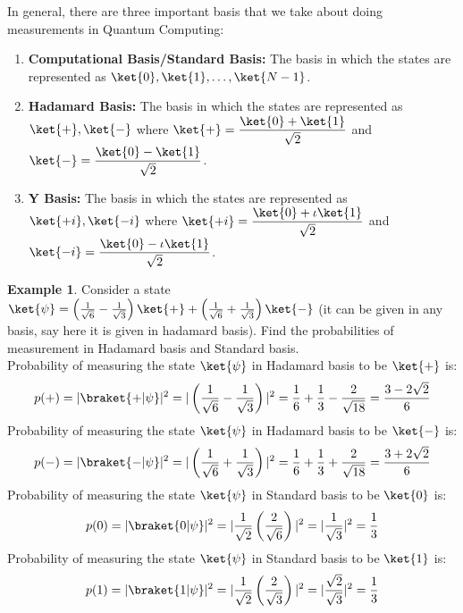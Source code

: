 \documentclass[12pt, oneside]{book}
\theoremstyle{definition}
\theoremstyle{definition}
\newtheorem{example}{Example}[section]
\theoremstyle{remark}
\begin{document}
\begin{importantnote}
    In general, there are three important basis that we take about doing measurements in Quantum Computing:
    \begin{enumerate}
        \item \textbf{Computational Basis/Standard Basis:} The basis in which the states are represented as $\ket{0},\ket{1},\ldots,\ket{N-1}$.
        \item \textbf{Hadamard Basis:} The basis in which the states are represented as $\ket{+},\ket{-}$ where $\ket{+}=\dfrac{\ket{0}+\ket{1}}{\sqrt{2}}$ and $\ket{-}=\dfrac{\ket{0}-\ket{1}}{\sqrt{2}}$.
        \item \textbf{Y Basis:} The basis in which the states are represented as $\ket{+i},\ket{-i}$ where $\ket{+i}=\dfrac{\ket{0}+\iota\ket{1}}{\sqrt{2}}$ and $\ket{-i}=\dfrac{\ket{0}-\iota\ket{1}}{\sqrt{2}}$.
    \end{enumerate}
\end{importantnote}

\begin{example}
    Consider a state $\ket{\psi}=\left(\frac{1}{\sqrt{6}}-\frac{1}{\sqrt{3}}\right)\ket{+}+\left(\frac{1}{\sqrt{6}}+\frac{1}{\sqrt{3}}\right)\ket{-}$ (it can be given in any basis, say here it is given in hadamard basis).
    Find the probabilities of measurement in Hadamard basis and Standard basis.\\
    Probability of measuring the state $\ket{\psi}$ in Hadamard basis to be $\ket{+}$ is:
    \[
        p(+)=|\braket{+|\psi}|^2=|\left(\frac{1}{\sqrt{6}}-\frac{1}{\sqrt{3}}\right)|^2=\frac{1}{6}+\frac{1}{3}-\frac{2}{\sqrt{18}}=\frac{3-2\sqrt{2}}{6}
    \]
    Probability of measuring the state $\ket{\psi}$ in Hadamard basis to be $\ket{-}$ is:
    \[
        p(-)=|\braket{-|\psi}|^2=|\left(\frac{1}{\sqrt{6}}+\frac{1}{\sqrt{3}}\right)|^2=\frac{1}{6}+\frac{1}{3}+\frac{2}{\sqrt{18}}=\frac{3+2\sqrt{2}}{6}
    \]
    Probability of measuring the state $\ket{\psi}$ in Standard basis to be $\ket{0}$ is:
    \[
        p(0)=|\braket{0|\psi}|^2=|\frac{1}{\sqrt{2}}\left(\frac{2}{\sqrt{6}}\right)|^2=|\frac{1}{\sqrt{3}}|^2=\frac{1}{3}
    \]
    Probability of measuring the state $\ket{\psi}$ in Standard basis to be $\ket{1}$ is:
    \[
        p(1)=|\braket{1|\psi}|^2=|\frac{1}{\sqrt{2}}\left(\frac{2}{\sqrt{3}}\right)|^2=|\frac{\sqrt{2}}{\sqrt{3}}|^2=\frac{1}{3}
    \]
\end{example}
\end{document}
